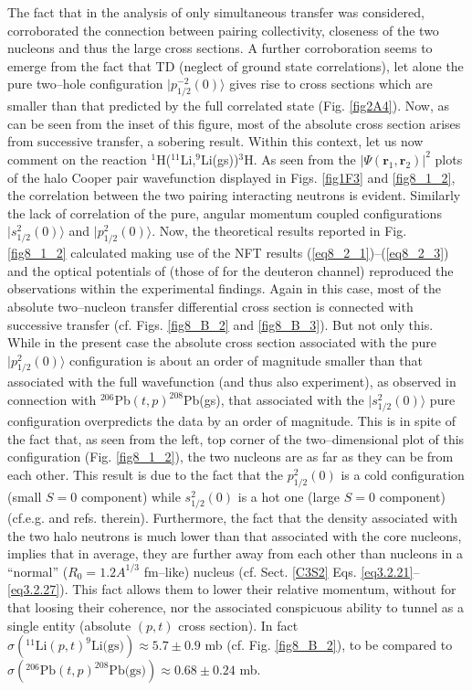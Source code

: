 The fact that in the analysis of \cite{Broglia:67} only simultaneous transfer was considered, corroborated the connection between pairing collectivity, closeness of the two nucleons and thus the large cross sections. A further corroboration seems to emerge from the fact that TD    (neglect of ground state correlations), let alone the pure two--hole configuration $|p^{-2}_{1/2}(0)\rangle$ gives rise to cross sections which are smaller than that predicted by the full correlated state (Fig. \ref{fig2A4}). Now, as can be seen from the inset of this figure, most of the absolute cross section arises from successive transfer, a sobering result. Within this context, let us now comment on the reaction  $^{1}$H($^{11}$Li,$^{9}$Li(gs))$^{3}$H. As seen from the $|\Psi(\mathbf r_1,\mathbf r_2)|^2$ plots of the halo Cooper pair wavefunction displayed in Figs. \ref{fig1F3} and \ref{fig8_1_2}, the correlation between the two pairing interacting neutrons is evident. Similarly the lack of correlation of the pure, angular momentum coupled configurations $|s^{2}_{1/2}(0)\rangle$ and  $|p^{2}_{1/2}(0)\rangle$. Now, the theoretical results reported in Fig. \ref{fig8_1_2} calculated making use of the NFT results (\ref{eq8_2_1})--(\ref{eq8_2_3}) and the optical potentials of \cite{Tanihata:08} (those of \cite{An:06} for the deuteron channel) reproduced the observations within the experimental findings. Again in this case, most of the absolute two--nucleon transfer differential cross section is connected with successive transfer (cf. Figs. \ref{fig8_B_2} and \ref{fig8_B_3}). But not only this. While in the present case the absolute cross section associated with the pure  $|p^{2}_{1/2}(0)\rangle$ configuration is about an order of magnitude smaller than that associated with the full wavefunction (and thus also experiment), as observed in connection with $^{206}$Pb$(t,p)^{208}$Pb(gs), that associated with the $|s^{2}_{1/2}(0)\rangle$ pure configuration overpredicts the data by an order of magnitude. This is in spite of the fact that, as seen from the left, top corner of the two--dimensional plot of this configuration (Fig. \ref{fig8_1_2}), the two nucleons are as far as they can be from each other. This result is due to the fact that the $p^2_{1/2}(0)$ is a cold configuration (small $S=0$ component) while $s^2_{1/2}(0)$ is a hot one (large $S=0$ component) (cf.e.g. \cite{Broglia:72b} and refs. therein). Furthermore, the fact that the density associated with the two halo neutrons is much lower than that associated with the core nucleons, implies that in average, they are  further away from each other than nucleons in a ``normal'' ($R_0=1.2 A^{1/3}$ fm--like) nucleus (cf. Sect. \ref{C3S2} Eqs. \ref{eq3.2.21}--\ref{eq3.2.27}). This fact allows them  to lower their relative momentum, without for that loosing their coherence, nor the associated conspicuous ability to tunnel as a single entity (absolute $(p,t)$ cross section). In fact $\sigma (^{11}\text{Li}(p,t)^9\text{Li(gs)})\approx5.7\pm 0.9 $ mb (cf. Fig. \ref{fig8_B_2}), to be compared to $\sigma (^{206}\text{Pb}(t,p)^{208}\text{Pb(gs)})\approx0.68\pm 0.24 $ mb. 


